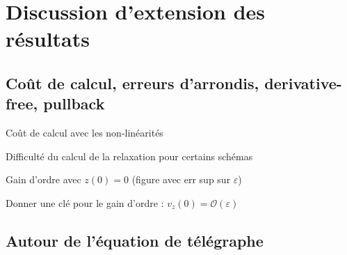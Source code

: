 
\clearemptydoublepage
\chapter{Discussion d'extension des résultats}

\section{Coût de calcul, erreurs d’arrondis, derivative-free, pullback}

Coût de calcul avec les non-linéarités

Difficulté du calcul de la relaxation pour certains schémas

Gain d’ordre avec $z(0) = 0$ (figure avec err sup sur $\varepsilon$)

Donner une clé pour le gain d’ordre : $v_z(0) = \mathcal{O}(\varepsilon)$


\section{Autour de l’équation de télégraphe}

